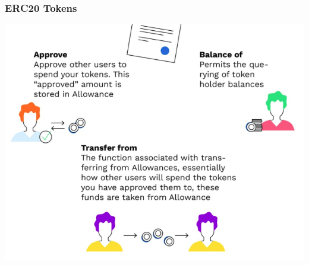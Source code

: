\documentclass[11pt]{beamer}  %
\begin{document}
\begin{frame}\frametitle{ERC20 Tokens}

  \begin{center}
    \includegraphics[scale=0.4,clip=false]{pictures/erc20_2.png}
  \end{center}
  
\end{frame}
\end{document}
